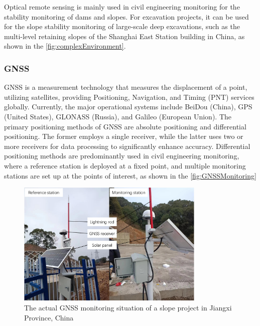 \documentclass[preprint,11pt,authoryear,3p]{elsarticle}
\begin{document}
Optical remote sensing is mainly used in civil engineering monitoring for the stability monitoring of dams and slopes. For excavation projects, it can be used for the slope stability monitoring of large-scale deep excavations, such as the multi-level retaining slopes of the Shanghai East Station building in China, as shown in the \autoref{fig:complexEnvironment}.

\subsubsection{GNSS}

GNSS is a measurement technology that measures the displacement of a point, utilizing satellites, providing Positioning, Navigation, and Timing (PNT) services globally. Currently, the major operational systems include BeiDou (China), GPS (United States), GLONASS (Russia), and Galileo (European Union). The primary positioning methods of GNSS are absolute positioning and differential positioning. The former employs a single receiver, while the latter uses two or more receivers for data processing to significantly enhance accuracy. Differential positioning methods are predominantly used in civil engineering monitoring, where a reference station is deployed at a fixed point, and multiple monitoring stations are set up at the points of interest, as shown in the \autoref{fig:GNSSMonitoring}

\begin{figure}
    \centering
    \includegraphics[width=0.8\textwidth]{imgs/GNSSMonitoring.pdf}
    \caption{The actual GNSS monitoring situation of a slope project in Jiangxi Province, China}
    \label{fig:GNSSMonitoring}
\end{figure}
\end{document}
